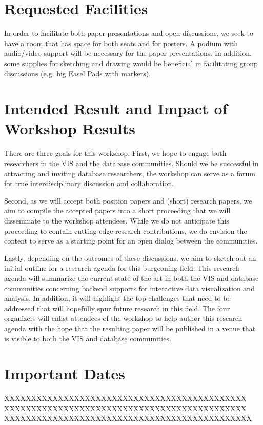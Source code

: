 \documentclass[journal]{vgtc}                %
\begin{document}
\section{Requested Facilities}

In order to facilitate both paper presentations and open discussions, we seek to have a room that has space for both seats and for posters.
A podium with audio/video support will be necessary for the paper presentations.
In addition, some supplies for sketching and drawing would be beneficial in facilitating group discussions (e.g. big Easel Pads with markers).

\section{Intended Result and Impact of Workshop Results}

There are three goals for this workshop. 
First, we hope to engage both researchers in the VIS and the database communities.
Should we be successful in attracting and inviting database researchers, the workshop can serve as a forum for true interdisciplinary discussion and collaboration.

Second, as we will accept both position papers and (short) research papers, we aim to compile the accepted papers into a short proceeding that we will disseminate to the workshop attendees. 
While we do not anticipate this proceeding to contain cutting-edge research contributions, we do envision the content to serve as a starting point for an open dialog between the communities.

Lastly, depending on the outcomes of these discussions, we aim to sketch out an initial outline for a research agenda for this burgeoning field.
This research agenda will summarize the current state-of-the-art in both the VIS and database communities concerning backend supports for interactive data visualization and analysis.
In addition, it will highlight the top challenges that need to be addressed that will hopefully spur future research in this field.
The four organizers will enlist attendees of the workshop to help author this research agenda with the hope that the resulting paper will be published in a venue that is visible to both the VIS and database communities.

\section{Important Dates}
XXXXXXXXXXXXXXXXXXXXXXXXXXXXXXXXXXXXXXXXXXXXX
XXXXXXXXXXXXXXXXXXXXXXXXXXXXXXXXXXXXXXXXXXXXX
XXXXXXXXXXXXXXXXXXXXXXXXXXXXXXXXXXXXXXXXXXXXXX
\end{document}
